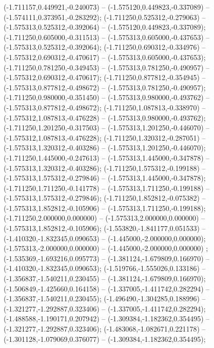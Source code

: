  (-1.711157,0.449921,-0.240073) -- (-1.575120,0.449823,-0.337089) -- (-1.574111,0.373951,-0.283292);
 (-1.711250,0.525312,-0.279063) -- (-1.575313,0.525312,-0.392064) -- (-1.575120,0.449823,-0.337089);
 (-1.711250,0.605000,-0.311513) -- (-1.575313,0.605000,-0.437653) -- (-1.575313,0.525312,-0.392064);
 (-1.711250,0.690312,-0.334976) -- (-1.575312,0.690312,-0.470617) -- (-1.575313,0.605000,-0.437653);
 (-1.711250,0.781250,-0.349453) -- (-1.575313,0.781250,-0.490957) -- (-1.575312,0.690312,-0.470617);
 (-1.711250,0.877812,-0.354945) -- (-1.575313,0.877812,-0.498672) -- (-1.575313,0.781250,-0.490957);
 (-1.711250,0.980000,-0.351450) -- (-1.575313,0.980000,-0.493762) -- (-1.575313,0.877812,-0.498672);
 (-1.711250,1.087813,-0.338970) -- (-1.575312,1.087813,-0.476228) -- (-1.575313,0.980000,-0.493762);
 (-1.711250,1.201250,-0.317503) -- (-1.575313,1.201250,-0.446070) -- (-1.575312,1.087813,-0.476228);
 (-1.711250,1.320312,-0.287051) -- (-1.575313,1.320312,-0.403286) -- (-1.575313,1.201250,-0.446070);
 (-1.711250,1.445000,-0.247613) -- (-1.575313,1.445000,-0.347878) -- (-1.575313,1.320312,-0.403286);
 (-1.711250,1.575312,-0.199188) -- (-1.575313,1.575312,-0.279846) -- (-1.575313,1.445000,-0.347878);
 (-1.711250,1.711250,-0.141778) -- (-1.575313,1.711250,-0.199188) -- (-1.575313,1.575312,-0.279846);
 (-1.711250,1.852812,-0.075382) -- (-1.575313,1.852812,-0.105906) -- (-1.575313,1.711250,-0.199188);
 (-1.711250,2.000000,0.000000) -- (-1.575313,2.000000,0.000000) -- (-1.575313,1.852812,-0.105906);
 (-1.553820,-1.841177,0.051533) -- (-1.410320,-1.832345,0.090653) -- (-1.445000,-2.000000,0.000000);
 (-1.575313,-2.000000,0.000000) -- (-1.445000,-2.000000,0.000000) ;
 (-1.535369,-1.693216,0.095773) -- (-1.381124,-1.679809,0.166970) -- (-1.410320,-1.832345,0.090653);
 (-1.519766,-1.555026,0.133186) -- (-1.356837,-1.540211,0.230455) -- (-1.381124,-1.679809,0.166970);
 (-1.506849,-1.425660,0.164158) -- (-1.337005,-1.411742,0.282294) -- (-1.356837,-1.540211,0.230455);
 (-1.496490,-1.304285,0.188996) -- (-1.321277,-1.292887,0.323406) -- (-1.337005,-1.411742,0.282294);
 (-1.488588,-1.190171,0.207942) -- (-1.309384,-1.182362,0.354495) -- (-1.321277,-1.292887,0.323406);
 (-1.483068,-1.082671,0.221178) -- (-1.301128,-1.079069,0.376077) -- (-1.309384,-1.182362,0.354495);
